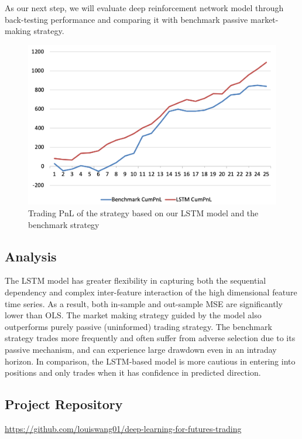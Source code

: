\documentclass{article}
\begin{document}
As our next step, we will evaluate deep reinforcement network model through back-testing performance and comparing it with benchmark passive market-making strategy.

\begin{figure}[h]
  \includegraphics[width=\linewidth]{lstm_pnl.png}
  \caption{Trading PnL of the strategy based on our LSTM model and the benchmark strategy}
  \label{fig:lstm_pnl}
\end{figure}

\subsection{Analysis}

The LSTM model has greater flexibility in capturing both the sequential dependency and complex inter-feature interaction of the high dimensional feature time series. As a result, both in-sample and out-sample MSE are significantly lower than OLS. The market making strategy guided by the model also outperforms purely passive (uninformed) trading strategy. The benchmark strategy trades more frequently and often suffer from adverse selection due to its passive mechanism, and can experience large drawdown even in an intraday horizon. In comparison, the LSTM-based model is more cautious in entering into positions and only trades when it has confidence in predicted direction.

\subsection{Project Repository}
\href{https://github.com/louiswang01/deep-learning-for-futures-trading}{https://github.com/louiswang01/deep-learning-for-futures-trading}



\end{document}
